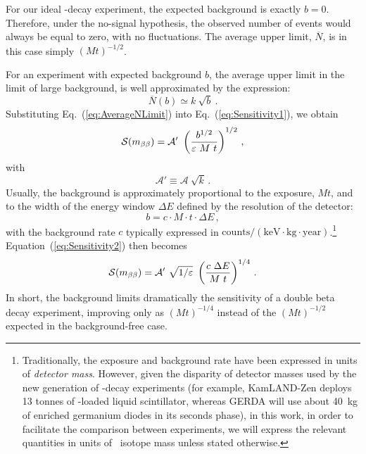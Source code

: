 \documentclass{PoS}
\begin{document}
For our ideal \bbonu-decay experiment, the expected background is exactly $b=0$. Therefore, under the no-signal hypothesis, the observed number of events would always be equal to zero, with no fluctuations. The average upper limit, $\overline{N}$, is in this case simply $(Mt)^{-1/2}$.

For an experiment with expected background $b$, the average upper limit in the limit of large background, is well approximated  by the expression:
\begin{equation}
\overline{N}(b) \simeq k~\sqrt{b}\ . \label{eq:AverageNLimit}
\end{equation}
Substituting Eq.~(\ref{eq:AverageNLimit}) into Eq.~(\ref{eq:Sensitivity1}), we obtain
\begin{equation}
\mathcal{S}(\mbb) = \mathcal{A}'\ \left(\frac{b^{1/2}}{\varepsilon~M~t}\right)^{1/2}\,, \label{eq:Sensitivity2}
\end{equation}
with
\begin{equation}
\mathcal{A}' \equiv \mathcal{A}\ \sqrt{k}\,.
\end{equation}
Usually, the background is approximately proportional to the exposure, $Mt$, and to the width of the energy window $\Delta E$ defined by the resolution of the detector:
\begin{equation}
b = c \cdot M \cdot t \cdot \Delta E \,,
\end{equation}
with the background rate $c$ typically expressed in $\mathrm{counts}/(\mathrm{keV}\cdot\mathrm{kg}\cdot\mathrm{year})$.\footnote{Traditionally, the exposure and background rate have been expressed in units of \emph{detector mass}. However, given the disparity of detector masses used by the new generation of \bbonu-decay experiments (for example, KamLAND-Zen deploys 13 tonnes of \XE-loaded liquid scintillator, whereas GERDA will use about 40~kg of enriched germanium diodes in its seconds phase), in this work, in order to facilitate the comparison between experiments, we will express the relevant quantities in units of \bb\ isotope mass unless stated otherwise.} Equation~(\ref{eq:Sensitivity2}) then becomes
\begin{equation}
\mathcal{S}(\mbb) = \mathcal{A}'\ \sqrt{1/\varepsilon}\ \left(\frac{c~\Delta E}{M~t}\right)^{1/4}\,. \label{eq:Sensitivity3}
\end{equation}
In short, the background limits dramatically the sensitivity of a double beta decay experiment, improving only as $(Mt)^{-1/4}$ instead of the $(Mt)^{-1/2}$ expected in the background-free case.
\end{document}
